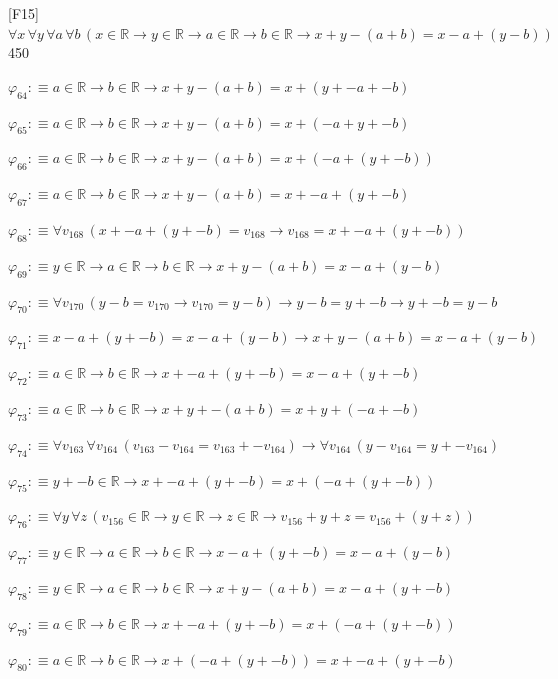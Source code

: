 \begin{fullproof}{[F15]}{$\forall x\,\forall y\,\forall a\,\forall b\,(x \in \mathbb{R} \to y \in \mathbb{R} \to a \in \mathbb{R} \to b \in \mathbb{R} \to x + y - (a + b) = x - a + (y - b))$}{450}
\begin{abbrevlist}
\item $\varphi_{64} :\equiv a \in \mathbb{R} \to b \in \mathbb{R} \to x + y - (a + b) = x + (y + -a + -b)$
\item $\varphi_{65} :\equiv a \in \mathbb{R} \to b \in \mathbb{R} \to x + y - (a + b) = x + (-a + y + -b)$
\item $\varphi_{66} :\equiv a \in \mathbb{R} \to b \in \mathbb{R} \to x + y - (a + b) = x + (-a + (y + -b))$
\item $\varphi_{67} :\equiv a \in \mathbb{R} \to b \in \mathbb{R} \to x + y - (a + b) = x + -a + (y + -b)$
\item $\varphi_{68} :\equiv \forall v_{168}\,(x + -a + (y + -b) = v_{168} \to v_{168} = x + -a + (y + -b))$
\item $\varphi_{69} :\equiv y \in \mathbb{R} \to a \in \mathbb{R} \to b \in \mathbb{R} \to x + y - (a + b) = x - a + (y - b)$
\item $\varphi_{70} :\equiv \forall v_{170}\,(y - b = v_{170} \to v_{170} = y - b) \to y - b = y + -b \to y + -b = y - b$
\item $\varphi_{71} :\equiv x - a + (y + -b) = x - a + (y - b) \to x + y - (a + b) = x - a + (y - b)$
\item $\varphi_{72} :\equiv a \in \mathbb{R} \to b \in \mathbb{R} \to x + -a + (y + -b) = x - a + (y + -b)$
\item $\varphi_{73} :\equiv a \in \mathbb{R} \to b \in \mathbb{R} \to x + y + -(a + b) = x + y + (-a + -b)$
\item $\varphi_{74} :\equiv \forall v_{163}\,\forall v_{164}\,(v_{163} - v_{164} = v_{163} + -v_{164}) \to \forall v_{164}\,(y - v_{164} = y + -v_{164})$
\item $\varphi_{75} :\equiv y + -b \in \mathbb{R} \to x + -a + (y + -b) = x + (-a + (y + -b))$
\item $\varphi_{76} :\equiv \forall y\,\forall z\,(v_{156} \in \mathbb{R} \to y \in \mathbb{R} \to z \in \mathbb{R} \to v_{156} + y + z = v_{156} + (y + z))$
\item $\varphi_{77} :\equiv y \in \mathbb{R} \to a \in \mathbb{R} \to b \in \mathbb{R} \to x - a + (y + -b) = x - a + (y - b)$
\item $\varphi_{78} :\equiv y \in \mathbb{R} \to a \in \mathbb{R} \to b \in \mathbb{R} \to x + y - (a + b) = x - a + (y + -b)$
\item $\varphi_{79} :\equiv a \in \mathbb{R} \to b \in \mathbb{R} \to x + -a + (y + -b) = x + (-a + (y + -b))$
\item $\varphi_{80} :\equiv a \in \mathbb{R} \to b \in \mathbb{R} \to x + (-a + (y + -b)) = x + -a + (y + -b)$

\end{abbrevlist}
\end{fullproof}
